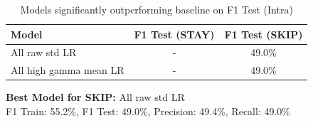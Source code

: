 \begin{table}[ht]
\centering
\begin{tabular}{lcc}
\hline
Model & F1 Test (STAY) & F1 Test (SKIP) \\
\hline
All raw std LR & - & 49.0\% \\
All high gamma mean LR & - & 49.0\% \\
\hline
\end{tabular}
\caption{Models significantly outperforming baseline on F1 Test (Intra)}
\label{tab:sig_f1_intra_ablation}
\end{table}

\vspace{1em}
\textbf{Best Model for SKIP:} All raw std LR \\
F1 Train: 55.2\%, F1 Test: 49.0\%, Precision: 49.4\%, Recall: 49.0\%
\vspace{1em}